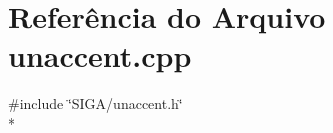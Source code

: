 \section{Referência do Arquivo unaccent.\+cpp}
\label{unaccent_8cpp}
{\ttfamily \#include \char`\"{}S\+I\+G\+A/unaccent.\+h\char`\"{}}\\*
